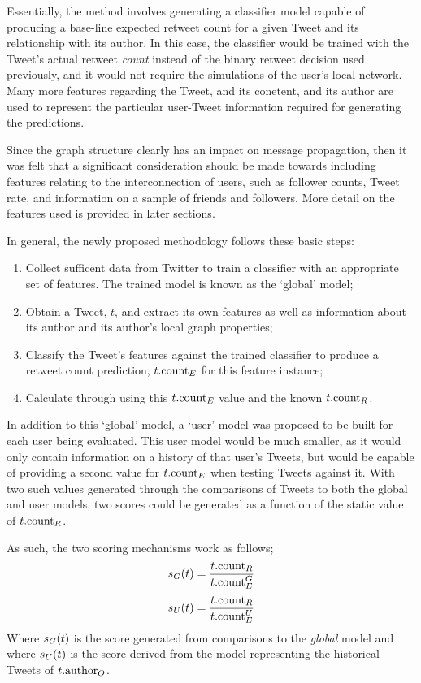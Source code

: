 Essentially, the method involves generating a classifier model capable of producing a base-line expected retweet count for a given Tweet and its relationship with its author. In this case, the classifier would be trained with the Tweet's actual retweet \textit{count} instead of the binary retweet decision used previously, and it would not require the simulations of the user's local network. Many more features regarding the Tweet, and its conetent, and its author are used to represent the particular user-Tweet information required for generating the predictions.

Since the graph structure clearly has an impact on message propagation, then it was felt that a significant consideration should be made towards including features relating to the interconnection of users, such as follower counts, Tweet rate, and information on a sample of friends and followers. More detail on the features used is provided in later sections.

In general, the newly proposed methodology follows these basic steps:
\begin{enumerate}
    \item Collect sufficent data from Twitter to train a classifier with an appropriate set of features. The trained model is known as the `global' model;
    \item Obtain a Tweet, $t$, and extract its own features as well as information about its author and its author's local graph properties;
    \item Classify the Tweet's features against the trained classifier to produce a retweet count prediction, $t.\textrm{count}_E$ for this feature instance;
    \item Calculate  through using this $t.\textrm{count}_E$ value and the known $t.\textrm{count}_R$.
\end{enumerate}

In addition to this `global' model, a `user' model was proposed to be built for each user being evaluated. This user model would be much smaller, as it would only contain information on a history of that user's Tweets, but would be capable of providing a second value for $t.\textrm{count}_E$ when testing Tweets against it. With two such values generated through the comparisons of Tweets to both the global and user models, two scores could be generated as a function of the static value of $t.\textrm{count}_R$.

As such, the two scoring mechanisms work as follows;
\[
    s_G(t) = \frac{t.\textrm{count}_R}{t.\textrm{count}^G_E}
\]
\[
    s_U(t) = \frac{t.\textrm{count}_R}{t.\textrm{count}^U_E}
\]
Where $s_G(t)$ is the score generated from comparisons to the \textit{global} model and where $s_U(t)$ is the score derived from the model representing the historical Tweets of $t.\textrm{author}_O$.

